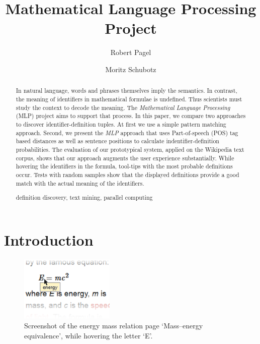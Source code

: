 \documentclass[runningheads]{llncs}
\newcommand{\keywords}[1]{\par\addvspace\baselineskip
\noindent\keywordname\enspace\ignorespaces#1}
\begin{document}
\mainmatter

\title{Mathematical Language Processing \\ Project}

\author{Robert Pagel \and Moritz Schubotz}



\maketitle


\begin{abstract}

In natural language, words and phrases themselves imply the semantics. In contrast, the meaning of identifiers in mathematical formulae is undefined.
Thus scientists must study the context to decode the meaning. The \emph{Mathematical Language Processing} (MLP) project aims to support that process.  In this paper, we compare two approaches to discover identifier-definition tuples.  At first we use a simple pattern matching approach. Second, we present the \emph{MLP} approach that uses Part-of-speech (POS) tag based distances as well as sentence positions to calculate indentifier-definition probabilities. The evaluation of our prototypical system, applied on the Wikipedia text corpus, shows that our approach augments the user experience substantially. While hovering the identifiers in the formula, tool-tips with the most probable definitions occur. Tests with random samples show that the displayed definitions provide a good match with the actual meaning of the identifiers.


\keywords{definition discovery, text mining, parallel computing}
\end{abstract}


\section{Introduction}

\begin{figure}
\label{fig:screenshot}
\vspace{-20pt}
	\includegraphics[width=0.4\textwidth]{screenshot}
\caption{Screenshot of the energy mass relation page `Mass–energy equivalence', while hovering the letter `E'.}
\vspace{-20pt}
\end{figure}
\end{document}
